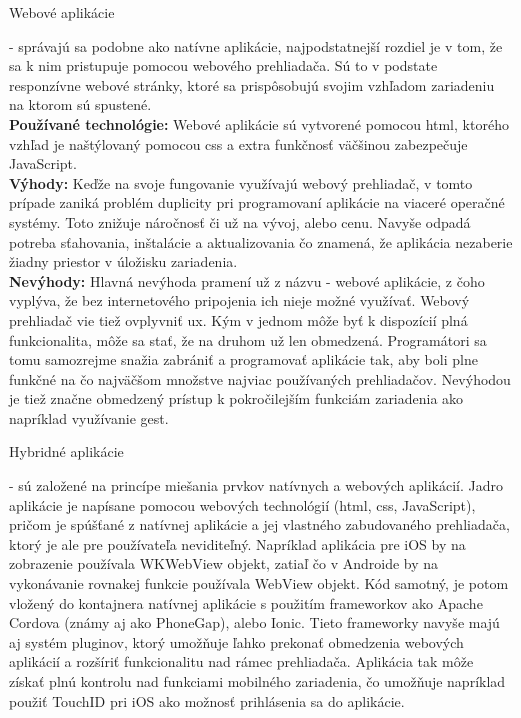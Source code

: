 \begin{itemize}[leftmargin=*]
{\bf \item Webové aplikácie} - správajú sa podobne ako natívne aplikácie, najpodstatnejší rozdiel je v tom, že sa k nim pristupuje pomocou webového prehliadača. Sú to v podstate responzívne webové stránky, ktoré sa prispôsobujú svojim vzhľadom zariadeniu na ktorom sú spustené. \\

{\bf Používané technológie:} Webové aplikácie sú vytvorené pomocou \acrshort{html}, ktorého vzhľad je naštýlovaný pomocou \acrshort{css} a extra funkčnosť väčšinou zabezpečuje JavaScript. \\

{\bf Výhody:} Keďže na svoje fungovanie využívajú webový prehliadač, v tomto prípade zaniká problém duplicity pri programovaní aplikácie na viaceré operačné systémy. Toto znižuje náročnosť či už na vývoj, alebo cenu. Navyše odpadá potreba sťahovania, inštalácie a aktualizovania čo znamená, že aplikácia nezaberie žiadny priestor v úložisku zariadenia.  \\
 
{\bf Nevýhody:}  Hlavná nevýhoda pramení už z názvu - webové aplikácie, z čoho vyplýva, že bez internetového pripojenia ich nieje možné využívať. Webový prehliadač vie tiež ovplyvniť \acrshort{ux}. Kým v jednom môže byť k dispozícií plná funkcionalita, môže sa stať, že na druhom už len obmedzená. Programátori sa tomu samozrejme snažia zabrániť a programovať aplikácie tak, aby boli plne funkčné na čo najväčšom množstve najviac používaných prehliadačov. Nevýhodou je tiež značne obmedzený prístup k pokročilejším funkciám zariadenia ako napríklad využívanie gest. \\
 
{\bf \item Hybridné aplikácie} - sú založené na princípe miešania prvkov natívnych a webových aplikácií. Jadro aplikácie je napísane pomocou webových technológií (\acrshort{html}, \acrshort{css}, JavaScript), pričom je spúšťané z natívnej aplikácie a jej vlastného zabudovaného prehliadača, ktorý je ale pre používateľa neviditeľný. Napríklad aplikácia pre iOS by na zobrazenie používala WKWebView objekt, zatiaľ čo v Androide by na vykonávanie rovnakej funkcie používala WebView objekt. Kód samotný, je potom vložený do kontajnera natívnej aplikácie s použitím frameworkov ako Apache Cordova (známy aj ako PhoneGap), alebo Ionic. Tieto frameworky navyše majú aj systém pluginov, ktorý umožňuje ľahko prekonať obmedzenia webových aplikácií a rozšíriť funkcionalitu nad rámec prehliadača. Aplikácia tak môže získať plnú kontrolu nad funkciami mobilného zariadenia, čo umožňuje napríklad použiť TouchID pri iOS ako možnosť prihlásenia sa do aplikácie.\\



\end{itemize}
